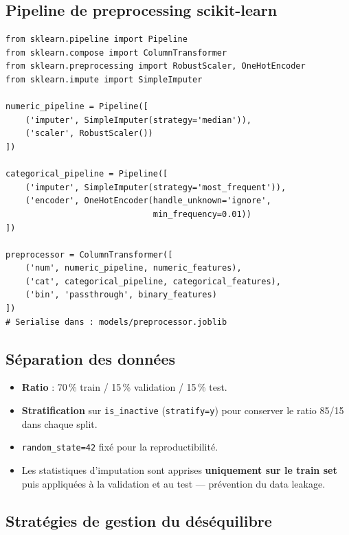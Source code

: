\documentclass[12pt,a4paper]{article}
\begin{document}
\subsection{Pipeline de preprocessing scikit-learn}

\begin{lstlisting}[style=python, caption={Structure du pipeline de preprocessing (extrait schématique)}, label=lst:pipeline]
from sklearn.pipeline import Pipeline
from sklearn.compose import ColumnTransformer
from sklearn.preprocessing import RobustScaler, OneHotEncoder
from sklearn.impute import SimpleImputer

numeric_pipeline = Pipeline([
    ('imputer', SimpleImputer(strategy='median')),
    ('scaler', RobustScaler())
])

categorical_pipeline = Pipeline([
    ('imputer', SimpleImputer(strategy='most_frequent')),
    ('encoder', OneHotEncoder(handle_unknown='ignore',
                              min_frequency=0.01))
])

preprocessor = ColumnTransformer([
    ('num', numeric_pipeline, numeric_features),
    ('cat', categorical_pipeline, categorical_features),
    ('bin', 'passthrough', binary_features)
])
# Serialise dans : models/preprocessor.joblib
\end{lstlisting}

\subsection{Séparation des données}

\begin{itemize}[noitemsep]
  \item \textbf{Ratio} : 70\,\% train / 15\,\% validation / 15\,\% test.
  \item \textbf{Stratification} sur \texttt{is\_inactive} (\texttt{stratify=y}) pour conserver
    le ratio 85/15 dans chaque split.
  \item \texttt{random\_state=42} fixé pour la reproductibilité.
  \item Les statistiques d'imputation sont apprises \textbf{uniquement sur le train set} puis
    appliquées à la validation et au test --- prévention du data leakage.
\end{itemize}

\subsection{Stratégies de gestion du déséquilibre}
\end{document}
